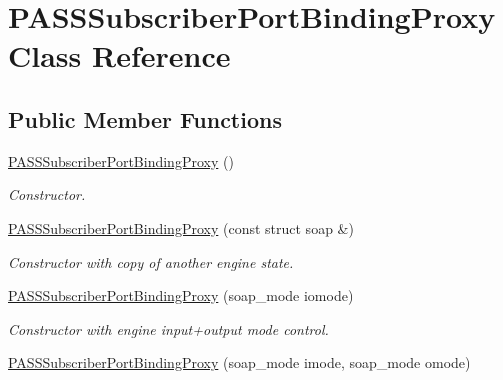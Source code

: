 \hypertarget{classPASSSubscriberPortBindingProxy}{
\section{PASSSubscriberPortBindingProxy Class Reference}
\label{classPASSSubscriberPortBindingProxy}
}
\subsection*{Public Member Functions}
\begin{DoxyCompactItemize}
\item 
\hypertarget{classPASSSubscriberPortBindingProxy_acc0b7e6d19e355c6d709b31b8e933a5a}{
\hyperlink{classPASSSubscriberPortBindingProxy_acc0b7e6d19e355c6d709b31b8e933a5a}{PASSSubscriberPortBindingProxy} ()}
\label{classPASSSubscriberPortBindingProxy_acc0b7e6d19e355c6d709b31b8e933a5a}

\begin{DoxyCompactList}\small\item\em Constructor. \item\end{DoxyCompactList}\item 
\hypertarget{classPASSSubscriberPortBindingProxy_aa72a4d751e405cdb0cee1ed769d3bd1b}{
\hyperlink{classPASSSubscriberPortBindingProxy_aa72a4d751e405cdb0cee1ed769d3bd1b}{PASSSubscriberPortBindingProxy} (const struct soap \&)}
\label{classPASSSubscriberPortBindingProxy_aa72a4d751e405cdb0cee1ed769d3bd1b}

\begin{DoxyCompactList}\small\item\em Constructor with copy of another engine state. \item\end{DoxyCompactList}\item 
\hypertarget{classPASSSubscriberPortBindingProxy_a7bfb38774c1354d63df40bd339edd4b9}{
\hyperlink{classPASSSubscriberPortBindingProxy_a7bfb38774c1354d63df40bd339edd4b9}{PASSSubscriberPortBindingProxy} (soap\_\-mode iomode)}
\label{classPASSSubscriberPortBindingProxy_a7bfb38774c1354d63df40bd339edd4b9}

\begin{DoxyCompactList}\small\item\em Constructor with engine input+output mode control. \item\end{DoxyCompactList}\item 
\hypertarget{classPASSSubscriberPortBindingProxy_a2ba4a55a6f334e10259124f7cfffa4de}{
\hyperlink{classPASSSubscriberPortBindingProxy_a2ba4a55a6f334e10259124f7cfffa4de}{PASSSubscriberPortBindingProxy} (soap\_\-mode imode, soap\_\-mode omode)}
\label{classPASSSubscriberPortBindingProxy_a2ba4a55a6f334e10259124f7cfffa4de}


\end{DoxyCompactItemize}
